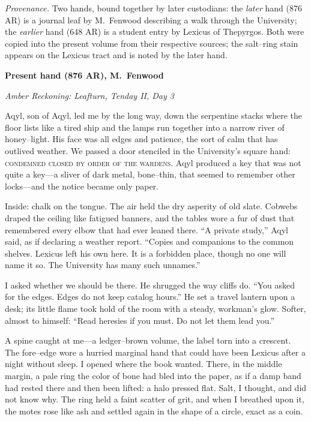 \documentclass[11pt]{article}
\numberwithin{equation}{section} %
\theoremstyle{plain} %
\theoremstyle{definition} %
\theoremstyle{remark} %
\begin{document}
\noindent\textit{Provenance.} Two hands, bound together by later custodians: the \emph{later} hand (876 AR) is a journal leaf by M.\ Fenwood describing a walk through the University; the \emph{earlier} hand (648 AR) is a student entry by Lexicus of Thepyrgos. Both were copied into the present volume from their respective sources; the salt–ring stain appears on the Lexicus tract and is noted by the later hand.

\medskip
\noindent\textbf{Present hand (876 AR), M.\ Fenwood}

\noindent\textit{Amber Reckoning: Leafturn, Tenday II, Day 3}

Aqyl, son of Aqyl, led me by the long way, down the serpentine stacks where the floor lists like a tired ship and the lamps run together into a narrow river of honey–light. His face was all edges and patience, the sort of calm that has outlived weather. We passed a door stenciled in the University’s square hand: \textsc{condemned \textemdash{} closed by order of the wardens}. Aqyl produced a key that was not quite a key—a sliver of dark metal, bone–thin, that seemed to remember other locks—and the notice became only paper.

Inside: chalk on the tongue. The air held the dry asperity of old slate. Cobwebs draped the ceiling like fatigued banners, and the tables wore a fur of dust that remembered every elbow that had ever leaned there. “A private study,” Aqyl said, as if declaring a weather report. “Copies and companions to the common shelves. Lexicus left his own here. It is a forbidden place, though no one will name it so. The University has many such unnames.”

I asked whether we should be there. He shrugged the way cliffs do. “You asked for the edges. Edges do not keep catalog hours.” He set a travel lantern upon a desk; its little flame took hold of the room with a steady, workman’s glow. Softer, almost to himself: “Read heresies if you must. Do not let them lead you.”

A spine caught at me—a ledger–brown volume, the label torn into a crescent. The fore–edge wore a hurried marginal hand that could have been Lexicus after a night without sleep. I opened where the book wanted. There, in the middle margin, a pale ring the color of bone had bled into the paper, as if a damp band had rested there and then been lifted: a halo pressed flat. Salt, I thought, and did not know why. The ring held a faint scatter of grit, and when I breathed upon it, the motes rose like ash and settled again in the shape of a circle, exact as a coin.
\end{document}
